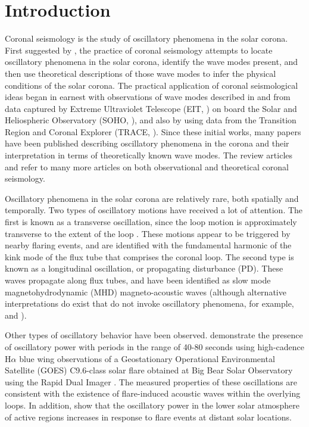 \documentclass[onecolumn]{emulateapj}
\newcommand{\BF}{ }
\begin{document}
\section{Introduction}\label{sec:int}
Coronal seismology is the study of oscillatory phenomena in the solar
corona.  First suggested by \cite{1970PASJ...22..341U}, the practice
of coronal seismology attempts to locate oscillatory phenomena in the
solar corona, identify the wave modes present, and then use
theoretical descriptions of those wave modes to infer the physical
conditions of the solar corona.  The practical application of coronal
seismological ideas began in earnest with observations of wave modes
{\BF described in \cite{1998ApJ...501L.217D} and
  \cite{1999SoPh..186..207B} from data captured by Extreme Ultraviolet
  Telescope (EIT, \citealp{1995SoPh..162..291D}) on board the Solar and Heliospheric
  Observatory (SOHO, \citealp{1995SoPh..162....1D}), and also by
  \citep{1999ApJ...520..880A} using data from the Transition Region
  and Coronal Explorer (TRACE, \citealp{1999SoPh..187..229H}).  Since these initial works,
  many papers have been published describing oscillatory phenomena in
  the corona and their interpretation in terms of theoretically known
  wave modes.  The review articles \cite{lrsp-2005-3} and
  \cite{2012RSPTA.370.3193D} refer to many more articles on both
  observational and theoretical coronal seismology}.

Oscillatory phenomena in the solar corona are relatively rare, both
spatially and temporally.  Two types of oscillatory motions have
received a lot of attention.  The first is known as a transverse
oscillation, since the loop motion is approximately transverse to the
extent of the loop \citep{1999Sci...285..862N}.  These motions appear
to be triggered by nearby flaring events, and are identified with the
fundamental harmonic of the kink mode of the flux tube that comprises
the coronal loop.  The second type is known as a longitudinal
oscillation, or propagating disturbance (PD).  These waves propagate
along flux tubes, and have been identified as slow mode
magnetohydrodynamic (MHD) magneto-acoustic waves (although alternative
interpretations do exist that do not invoke oscillatory phenomena, for
example, \citealp*{0004-637X-722-2-1013} and
\citealp*{2041-8205-727-2-L37}).  

Other types of oscillatory behavior have been observed.
\cite{2005ApJ...620.1101M} demonstrate the presence of oscillatory
power with periods in the range of 40-80 seconds using high-cadence
H$\alpha$ blue wing observations of a Geostationary Operational
Environmental Satellite (GOES) C9.6-class solar flare obtained at Big
Bear Solar Observatory using the Rapid Dual Imager
\citep{2000SoPh..193..259P, 2007A&A...473..943J}. The measured
properties of these oscillations are consistent with the existence of
flare-induced acoustic waves within the overlying loops.  In addition,
\cite{2013ApJ...772...54A} show that the oscillatory power in the
lower solar atmosphere of active regions increases in response to
flare events at distant solar locations.
\end{document}
